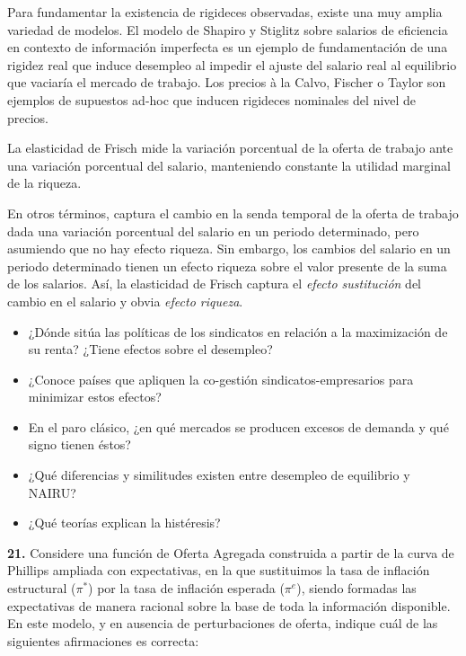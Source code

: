 \documentclass{nuevotema}
\begin{document}
Para fundamentar la existencia de rigideces observadas, existe una muy amplia variedad de modelos. El modelo de Shapiro y Stiglitz sobre salarios de eficiencia en contexto de información imperfecta es un ejemplo de fundamentación de una rigidez real que induce desempleo al impedir el ajuste del salario real al equilibrio que vaciaría el mercado de trabajo. Los precios à la Calvo, Fischer o Taylor son ejemplos de supuestos ad-hoc que inducen rigideces nominales del nivel de precios. 



La elasticidad de Frisch mide la variación porcentual de la oferta de trabajo ante una variación porcentual del salario, manteniendo constante la utilidad marginal de la riqueza.

En otros términos, captura el cambio en la senda temporal de la oferta de trabajo dada una variación porcentual del salario en un periodo determinado, pero asumiendo que no hay efecto riqueza. Sin embargo, los cambios del salario en un periodo determinado tienen un efecto riqueza sobre el valor presente de la suma de los salarios. Así, la elasticidad de Frisch captura el \textit{efecto sustitución} del cambio en el salario y obvia \textit{efecto riqueza}.

\preguntas


\begin{itemize}
	\item ¿Dónde sitúa las políticas de los sindicatos en relación a la maximización de su renta? ¿Tiene efectos sobre el desempleo?
	\item ¿Conoce países que apliquen la co-gestión sindicatos-empresarios para minimizar estos efectos?
	\item En el paro clásico, ¿en qué mercados se producen excesos de demanda y qué signo tienen éstos?
	\item ¿Qué diferencias y similitudes existen entre desempleo de equilibrio y NAIRU?
	\item ¿Qué teorías explican la histéresis?
\end{itemize}


\textbf{21.} Considere una función de Oferta Agregada construida a partir de la curva de Phillips ampliada con expectativas, en la que sustituimos la tasa de inflación estructural ($\pi^*$) por la tasa de inflación esperada ($\pi^e$), siendo formadas las expectativas de manera racional sobre la base de toda la información disponible. En este modelo, y en ausencia de perturbaciones de oferta, indique cuál de las siguientes afirmaciones es correcta:
\end{document}
